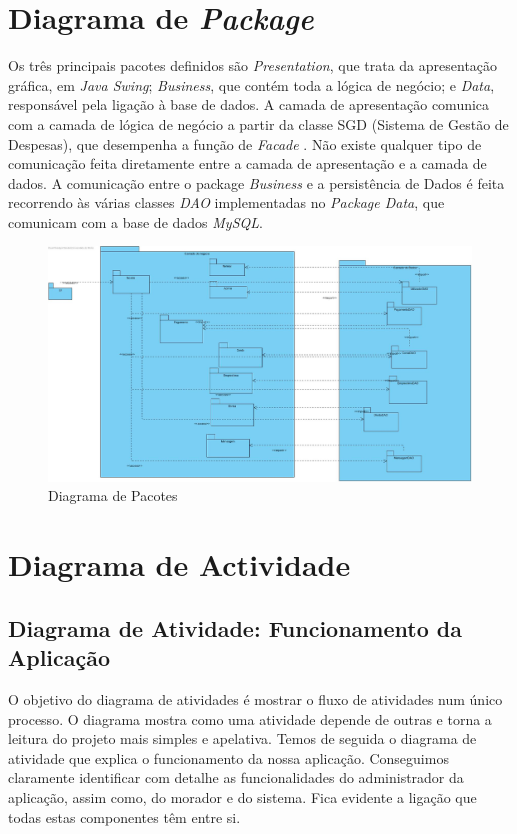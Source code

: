\newpage


\section{Diagrama de \textit{Package}}

Os três principais pacotes definidos são \textit{Presentation}, que trata da apresentação gráfica, em \textit{Java Swing}; \textit{Business}, que contém toda a lógica de negócio; e \textit{Data}, responsável pela ligação à base de dados. A camada de apresentação comunica com a camada de lógica de negócio a partir da classe
SGD (Sistema de Gestão de Despesas), que desempenha a função de \textit{Facade} .
Não existe qualquer tipo de comunicação feita diretamente entre a camada de
apresentação e a camada de dados. A comunicação entre o package \textit{Business}
e a persistência de Dados é feita recorrendo às várias classes \textit{DAO} implementadas no \textit{Package Data}, que comunicam com a base de dados \textit{MySQL}.

\begin{figure}[htb!]
	\centering
	\includegraphics[scale=0.29]{imagens/DiagramInstalacao/PackageDiagram}  
	\caption{Diagrama de Pacotes}  
\end{figure}

\newpage \clearpage

\section{Diagrama de Actividade}
\subsection{Diagrama de Atividade: Funcionamento da Aplicação}

O objetivo do diagrama de atividades é mostrar o fluxo de atividades num único processo. O diagrama mostra como uma atividade depende de outras e torna a leitura do projeto mais simples e apelativa. Temos de seguida o diagrama de atividade que explica o funcionamento da nossa aplicação. Conseguimos claramente identificar com detalhe as funcionalidades do administrador da aplicação, assim como, do morador e do sistema. Fica evidente a ligação que todas estas componentes têm entre si. 

